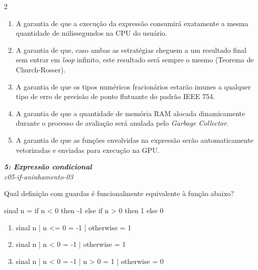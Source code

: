 \documentclass[a4paper,10pt,brazil]{article}
\begin{document}
\begin{multicols}{2}
\begin{enumerate}
  \item A garantia de que a execução da expressão consumirá exatamente a mesma quantidade de milissegundos na CPU do usuário.

  \item A garantia de que, caso ambas as estratégias cheguem a um resultado final sem entrar em \emph{loop} infinito, este resultado será sempre o mesmo (Teorema de Church-Rosser).

  \item A garantia de que os tipos numéricos fracionários estarão imunes a qualquer tipo de erro de precisão de ponto flutuante do padrão IEEE 754.

  \item A garantia de que a quantidade de memória RAM alocada dinamicamente durante o processo de avaliação será anulada pelo \emph{Garbage Collector}.

  \item A garantia de que as funções envolvidas na expressão serão automaticamente vetorizadas e enviadas para execução na GPU.


\end{enumerate}

\begin{flushright}
  \footnotesize
  \textit{\textbf{5: Expressão condicional}}\\
  \textit{c05-if-aninhamento-03}\\

\end{flushright}
Qual definição com guardas é funcionalmente equivalente à função abaixo?
\begin{haskellcode}
sinal n = if n < 0 then -1 else if n > 0 then 1 else 0
\end{haskellcode}

\begin{enumerate}
  \item \begin{haskellcode}
sinal n
  | n <= 0    = -1
  | otherwise = 1
\end{haskellcode}

  \item \begin{haskellcode}
sinal n
  | n < 0     = -1
  | otherwise = 1
\end{haskellcode}

  \item \begin{haskellcode}
sinal n
  | n < 0     = -1
  | n > 0     = 1
  | otherwise = 0
\end{haskellcode}


\end{enumerate}
\end{multicols}
\end{document}
